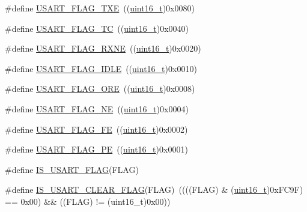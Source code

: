 \begin{DoxyCompactItemize}
\#define \hyperlink{group___u_s_a_r_t___flags_ga7129f13333f2a7218838cc32fe507bfa}{U\+S\+A\+R\+T\+\_\+\+F\+L\+A\+G\+\_\+\+T\+XE}~((\hyperlink{_p_e___types_8h_a1f1825b69244eb3ad2c7165ddc99c956}{uint16\+\_\+t})0x0080)
\item 
\#define \hyperlink{group___u_s_a_r_t___flags_gae7b85c9e2cc86af5bbc8b8d8b854410f}{U\+S\+A\+R\+T\+\_\+\+F\+L\+A\+G\+\_\+\+TC}~((\hyperlink{_p_e___types_8h_a1f1825b69244eb3ad2c7165ddc99c956}{uint16\+\_\+t})0x0040)
\item 
\#define \hyperlink{group___u_s_a_r_t___flags_ga11d6b70c8f00216b6d8a43790dfdcf2f}{U\+S\+A\+R\+T\+\_\+\+F\+L\+A\+G\+\_\+\+R\+X\+NE}~((\hyperlink{_p_e___types_8h_a1f1825b69244eb3ad2c7165ddc99c956}{uint16\+\_\+t})0x0020)
\item 
\#define \hyperlink{group___u_s_a_r_t___flags_gac2f1ccc91a834f9cbec3f058872b972a}{U\+S\+A\+R\+T\+\_\+\+F\+L\+A\+G\+\_\+\+I\+D\+LE}~((\hyperlink{_p_e___types_8h_a1f1825b69244eb3ad2c7165ddc99c956}{uint16\+\_\+t})0x0010)
\item 
\#define \hyperlink{group___u_s_a_r_t___flags_gabdb285b5c1876d93f9c802f9304538d5}{U\+S\+A\+R\+T\+\_\+\+F\+L\+A\+G\+\_\+\+O\+RE}~((\hyperlink{_p_e___types_8h_a1f1825b69244eb3ad2c7165ddc99c956}{uint16\+\_\+t})0x0008)
\item 
\#define \hyperlink{group___u_s_a_r_t___flags_ga81781d27ffc8b85dfaf7b7b791229547}{U\+S\+A\+R\+T\+\_\+\+F\+L\+A\+G\+\_\+\+NE}~((\hyperlink{_p_e___types_8h_a1f1825b69244eb3ad2c7165ddc99c956}{uint16\+\_\+t})0x0004)
\item 
\#define \hyperlink{group___u_s_a_r_t___flags_ga3551a32bac49a2ec040e5fdafcc9c4bd}{U\+S\+A\+R\+T\+\_\+\+F\+L\+A\+G\+\_\+\+FE}~((\hyperlink{_p_e___types_8h_a1f1825b69244eb3ad2c7165ddc99c956}{uint16\+\_\+t})0x0002)
\item 
\#define \hyperlink{group___u_s_a_r_t___flags_ga5e87fde5704f27c75df25395e23404ad}{U\+S\+A\+R\+T\+\_\+\+F\+L\+A\+G\+\_\+\+PE}~((\hyperlink{_p_e___types_8h_a1f1825b69244eb3ad2c7165ddc99c956}{uint16\+\_\+t})0x0001)
\item 
\#define \hyperlink{group___u_s_a_r_t___flags_ga3e20747ce7c97a36718933c0cb3dac29}{I\+S\+\_\+\+U\+S\+A\+R\+T\+\_\+\+F\+L\+AG}(F\+L\+AG)
\item 
\#define \hyperlink{group___u_s_a_r_t___flags_gadc905fdce8defba31c00c95554a26bc3}{I\+S\+\_\+\+U\+S\+A\+R\+T\+\_\+\+C\+L\+E\+A\+R\+\_\+\+F\+L\+AG}(F\+L\+AG)~((((F\+L\+AG) \& (\hyperlink{_p_e___types_8h_a1f1825b69244eb3ad2c7165ddc99c956}{uint16\+\_\+t})0x\+F\+C9\+F) == 0x00) \&\& ((\+F\+L\+A\+G) != (uint16\+\_\+t)0x00))
\item 

\end{DoxyCompactItemize}
